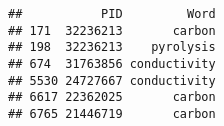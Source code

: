 \documentclass[
  a4paper]{article}
\newenvironment{Shaded}{\begin{snugshade}}{\end{snugshade}}
\newcommand{\CommentTok}[1]{\textcolor[rgb]{0.56,0.35,0.01}{\textit{#1}}}
\newcommand{\DataTypeTok}[1]{\textcolor[rgb]{0.13,0.29,0.53}{#1}}
\newcommand{\KeywordTok}[1]{\textcolor[rgb]{0.13,0.29,0.53}{\textbf{#1}}}
\newcommand{\NormalTok}[1]{#1}
\newcommand{\OperatorTok}[1]{\textcolor[rgb]{0.81,0.36,0.00}{\textbf{#1}}}
\newcommand{\StringTok}[1]{\textcolor[rgb]{0.31,0.60,0.02}{#1}}
\begin{document}
\begin{Shaded}
\end{Shaded}

\begin{verbatim}
##           PID         Word
## 171  32236213       carbon
## 198  32236213    pyrolysis
## 674  31763856 conductivity
## 5530 24727667 conductivity
## 6617 22362025       carbon
## 6765 21446719       carbon
\end{verbatim}
\end{document}
